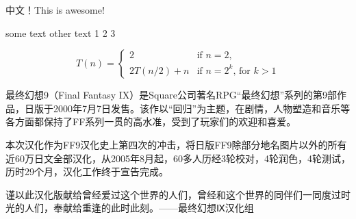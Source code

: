 \documentclass[12pt,a4paper]{article}
\begin{document}
{ 中文！}This is awesome!

{\MyTitle some text} {\FooBar other text 1 2 3} 


\begin{equation*}
T(n) = \left\{
  \begin{array}{ll}
    2         & \text{if $n=2$,}\\
    2T(n/2)+n & \text{if $n=2^k$, for $k>1$}
  \end{array}
\right.
\end{equation*}

最终幻想9（Final Fantasy IX）是Square公司著名RPG“最终幻想”系列的第9部作品，日版于2000年7月7日发售。该作以“回归”为主题，在剧情，人物塑造和音乐等各方面都保持了FF系列一贯的高水准，受到了玩家们的欢迎和喜爱。

本次汉化作为FF9汉化史上第四次的冲击，将日版FF9除部分地名图片以外的所有近60万日文全部汉化，从2005年8月起，60多人历经3轮校对，4轮润色，4轮测试，历时29个月，汉化工作终于宣告完成。

谨以此汉化版献给曾经爱过这个世界的人们，曾经和这个世界的同伴们一同度过时光的人们，奉献给重逢的此时此刻。——最终幻想Ⅸ汉化组
\end{document}
